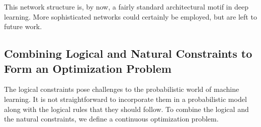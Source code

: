\documentclass[sigplan,10pt,review,anonymous]{acmart} %
\newcommand{\margincomment}[2]{\marginpar{\scriptsize\color{Maroon}#1 says: #2}}
\newcommand{\ivp}[1]{\margincomment{IVP}{#1}}
\theoremstyle{plain}
\theoremstyle{remark}
\theoremstyle{definition}
\begin{document}
This network structure is, by now, a fairly standard architectural motif in deep learning.
More sophisticated networks could certainly be employed, but are left to future work.

\subsection{Combining Logical and Natural Constraints to Form an Optimization
  Problem} \label{ssec:optimisation}

The logical constraints pose challenges to the probabilistic world of
machine learning. It is not straightforward to incorporate them in a probabilistic model
along with the logical rules that they should follow.
To combine the logical and the natural constraints, we define a continuous
optimization problem.
\end{document}
